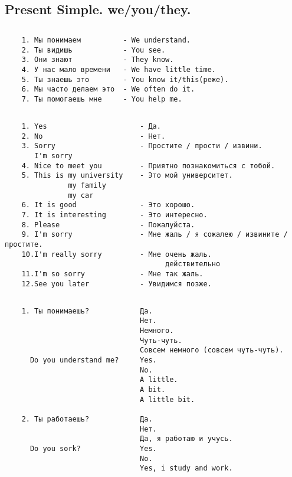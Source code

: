 \subsection{Present Simple. we/you/they.}
\subsection*{}
\begin{verbatim}
    1. Мы понимаем          - We understand.
    2. Ты видишь            - You see.
    3. Они знают            - They know.
    4. У нас мало времени   - We have little time.
    5. Ты знаешь это        - You know it/this(реже).
    6. Мы часто делаем это  - We often do it.
    7. Ты помогаешь мне     - You help me.
\end{verbatim}

\subsection*{}
\begin{verbatim}
    1. Yes                      - Да.
    2. No                       - Нет.
    3. Sorry                    - Простите / прости / извини.
       I'm sorry
    4. Nice to meet you         - Приятно познакомиться с тобой.
    5. This is my university    - Это мой университет.
               my family
               my car
    6. It is good               - Это хорошо.
    7. It is interesting        - Это интересно.
    8. Please                   - Пожалуйста.
    9. I'm sorry                - Мне жаль / я сожалею / извините / простите.
    10.I'm really sorry         - Мне очень жаль.
                                      действительно
    11.I'm so sorry             - Мне так жаль.
    12.See you later            - Увидимся позже.
\end{verbatim}

\subsection*{}
\begin{verbatim}
    1. Ты понимаешь?            Да.
                                Нет.
                                Немного.
                                Чуть-чуть.
                                Совсем немного (совсем чуть-чуть).
      Do you understand me?     Yes.
                                No.
                                A little.
                                A bit.
                                A little bit.
    
    2. Ты работаешь?            Да.
                                Нет.
                                Да, я работаю и учусь.
      Do you sork?              Yes.
                                No.
                                Yes, i study and work.
\end{verbatim}

